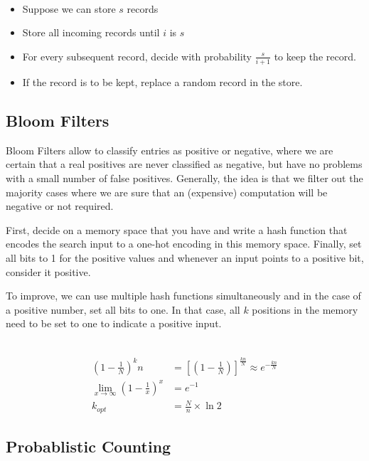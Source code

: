 \begin{definition}
  ~
  \begin{itemize}
    \item Suppose we can store $s$ records
    \item Store all incoming records until $i$ is $s$
    \item For every subsequent record, decide with probability $\frac{s}{i+1}$
      to keep the record.
    \item If the record is to be kept, replace a random record in the store.
  \end{itemize}
\end{definition}

\subsection{Bloom Filters}

Bloom Filters allow to classify entries as positive or negative,
where we are certain that a real positives are never classified as
negative, but have no problems with a small number of false positives.
Generally, the idea is that we filter out the majority cases where we
are sure that an (expensive) computation will be negative or not
required.

First, decide on a memory space that you have and write a hash function
that encodes the search input to a one-hot encoding in this memory space.
Finally, set all bits to 1 for the positive values and whenever an
input points to a positive bit, consider it positive.

To improve, we can use multiple hash functions simultaneously and in the
case of a positive number, set all bits to one. In that case, all $k$ positions
in the memory need to be set to one to indicate a positive input.

\begin{definition}
  ~
  \begin{align*}
    \left( 1 - \frac{1}{N} \right)^kn &=
    \left[ \left( 1 - \frac{1}{N} \right) \right]^{\frac{kn}{N}}
    \approx e^{-\frac{kn}{N}} \\
    \lim_{x\to\infty} \left(1 - \frac{1}{x}\right)^x &= e^{-1} \\
    k_{opt} &= \frac{N}{n} \times \ln{2}
  \end{align*}
\end{definition}

\subsection{Probablistic Counting}

